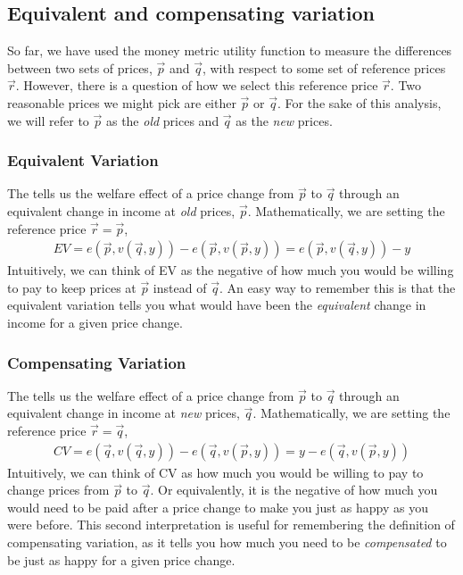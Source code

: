 \subsection*{Equivalent and compensating variation}
So far, we have used the money metric utility function to measure the differences between two sets of prices, $\vec{p}$ and $\vec{q}$, with respect to some set of reference prices $\vec{r}$. However, there is a question of how we select this reference price $\vec{r}$. Two reasonable prices we might pick are either $\vec{p}$ or $\vec{q}$. For the sake of this analysis, we will refer to $\vec{p}$ as the \emph{old} prices and $\vec{q}$ as the \emph{new} prices.

\subsubsection*{Equivalent Variation}
The  tells us the welfare effect of a price change from $\vec{p}$ to $\vec{q}$ through an equivalent change in income at \emph{old} prices, $\vec{p}$. Mathematically, we are setting the reference price $\vec{r} = \vec{p}$,
\begin{align*}
    EV = e(\vec{p}, v(\vec{q}, y)) - e(\vec{p}, v(\vec{p}, y)) = e(\vec{p}, v(\vec{q}, y)) - y
\end{align*}
Intuitively, we can think of EV as the negative of how much you would be willing to pay to keep prices at $\vec{p}$ instead of $\vec{q}$. An easy way to remember this is that the equivalent variation tells you what would have been the \emph{equivalent} change in income for a given price change.

\subsubsection*{Compensating Variation}
The  tells us the welfare effect of a price change from $\vec{p}$ to $\vec{q}$ through an equivalent change in income at \emph{new} prices, $\vec{q}$. Mathematically, we are setting the reference price $\vec{r} = \vec{q}$,
\begin{align*}
    CV = e(\vec{q}, v(\vec{q}, y)) - e(\vec{q}, v(\vec{p}, y)) = y - e(\vec{q}, v(\vec{p}, y))
\end{align*}
Intuitively, we can think of CV as how much you would be willing to pay to change prices from $\vec{p}$ to $\vec{q}$. Or equivalently, it is the negative of how much you would need to be paid after a price change to make you just as happy as you were before. This second interpretation is useful for remembering the definition of compensating variation, as it tells you how much you need to be \emph{compensated} to be just as happy for a given price change. 

